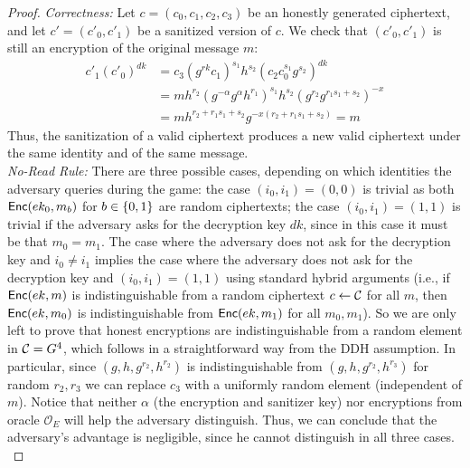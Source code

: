 \documentclass{llncs}
\begin{document}
\begin{proof}
\emph{Correctness:} 
Let $c = (c_0, c_1, c_2, c_3)$  be an honestly generated ciphertext, and let $c' = (c'_0, c'_1)$ be a sanitized version of $c$. We check that $(c'_0,c'_1)$ is still an encryption of the original message $m$:
\begin{align*}
	c'_1(c'_0)^{dk} &= c_3 (g^{rk} c_1)^{s_1} h^{s_2}(c_2c_0^{s_1}g^{s_2})^{dk} \\
&= 	mh^{r_2} (g^{-\alpha} g^\alpha h^{r_1})^{s_1}h^{s_2}(g^{r_2} g^{r_1s_1+s_2})^{-x} \\
&= m h^{r_2+r_1s_1+s_2} g^{-x(r_2+r_1s_1+s_2)} = m
\end{align*}
Thus, the sanitization of a valid ciphertext produces a new valid ciphertext under the same identity and of the same message.
\\


\noindent \emph{No-Read Rule:}
There are three possible cases, depending on which identities the adversary queries during the game: the case $(i_0,i_1)=(0,0)$ is trivial as both $\mathsf{Enc}(ek_0,m_b)$ for $b\in\{0,1\}$ are random ciphertexts; the case $(i_0,i_1)=(1,1)$ is trivial if the adversary asks for the decryption key $dk$, since in this case it must be that $m_0=m_1$. The case where the adversary does not ask for the decryption key and $i_0\neq i_1$ implies the case where the adversary does not ask for the decryption key and $(i_0,i_1)=(1,1)$ using standard hybrid arguments (i.e., if $\mathsf{Enc}(ek,m)$ is indistinguishable from a random ciphertext $c\leftarrow \mathcal{C}$ for all $m$, then $\mathsf{Enc}(ek,m_0)$ is indistinguishable from $\mathsf{Enc}(ek,m_1)$ for all $m_0,m_1$). So we are only left to prove that honest encryptions are indistinguishable from a random element in $\mathcal{C}=G^4$, which follows in a straightforward way from the DDH assumption. In particular, since $(g,h,g^{r_2},h^{r_2})$ is indistinguishable from $(g,h,g^{r_2},h^{r_3})$ for random $r_2,r_3$ we can replace $c_3$ with a uniformly random element (independent of $m$). Notice that neither $\alpha$ (the encryption and sanitizer key) nor encryptions from oracle $\mathcal{O}_E$ will help the adversary distinguish. 
Thus, we can conclude that the adversary's advantage is negligible, since he cannot distinguish in all three cases.
\\



\end{proof}
\end{document}
